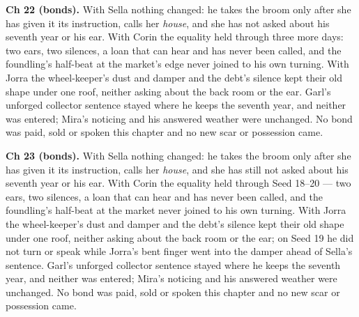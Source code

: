 \documentclass{design/chronicle}
\begin{document}
{\textbf{Ch 22 (bonds).} With Sella nothing changed: he takes the broom only after she has given it its instruction, calls her \emph{house}, and she has not asked about his seventh year or his ear. With Corin the equality held through three more days: two ears, two silences, a loan that can hear and has never been called, and the foundling’s half-beat at the market’s edge never joined to his own turning. With Jorra the wheel-keeper’s dust and damper and the debt’s silence kept their old shape under one roof, neither asking about the back room or the ear. Garl’s unforged collector sentence stayed where he keeps the seventh year, and neither was entered; Mira’s noticing and his answered weather were unchanged. No bond was paid, sold or spoken this chapter and no new scar or possession came.

\textbf{Ch 23 (bonds).} With Sella nothing changed: he takes the broom only after she has given it its instruction, calls her \emph{house}, and she has still not asked about his seventh year or his ear. With Corin the equality held through Seed 18–20 — two ears, two silences, a loan that can hear and has never been called, and the foundling’s half-beat at the market never joined to his own turning. With Jorra the wheel-keeper’s dust and damper and the debt’s silence kept their old shape under one roof, neither asking about the back room or the ear; on Seed 19 he did not turn or speak while Jorra’s bent finger went into the damper ahead of Sella’s sentence. Garl’s unforged collector sentence stayed where he keeps the seventh year, and neither was entered; Mira’s noticing and his answered weather were unchanged. No bond was paid, sold or spoken this chapter and no new scar or possession came.

}
\end{document}
